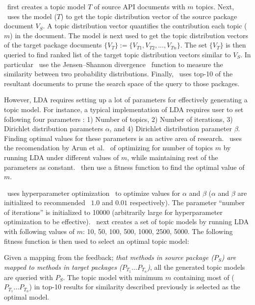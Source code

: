\tool\ first creates a topic model $T$ of source API documents with $m$ topics.
Next, \tool\ uses the model ($T$) to get the topic distribution vector of the source package document $V_{S}$.
A topic distribution vector quantifies the contribution each topic ($m$) in the document.
The model is next used to get the topic distribution vectors of the target package documents $\{V_{T}\}:=\{V_{T1},V_{T2},...,V_{Tn}\}$.
The set $\{V_{T}\}$ is then queried to find ranked list of the target topic distribution vectors similar to $V_{S}$.
In particular \tool\ use the Jensen–Shannon divergence~\cite{lin1991divergence} function to measure the similarity between two probability distributions. 
Finally, \tool\ uses top-10 of the resultant documents to prune the search space of the query to those packages.

However, LDA requires setting up a lot of parameters for effectively generating a topic model.
For instance, a typical implementation of LDA requires user to set following four parameters : 1) Number of topics, 2) Number of iterations, 3) Dirichlet distribution parameters $\alpha$, and 4) Dirichlet distribution parameter $\beta$.
Finding optimal values for these parameters is an active area of research.
\tool\ uses the recomendation by Arun et al.~\cite{arun2010finding} of optimizing for number of topics $m$ by running LDA under different values of $m$, while maintaining rest of the parameters as constant.
\tool\ then use a fitness function to find the optimal value of $m$.


\tool\ uses hyperparameter optimization~\cite{mccallum2002mallet} to optimize values for $\alpha$ and $\beta$ ($\alpha$ and $\beta$ are initialized to recommended~\cite{mccallum2002mallet} $1.0$ and $0.01$ respectively).
The parameter ``number of iterations'' is initialized to 10000 (arbitrarily large for hyperparameter optimization to be effective).
\tool\ next creates a set of topic models by running LDA with following values of $m$: 10, 50, 100, 500, 1000, 2500, 5000.
The following fitness function is then used to select an optimal topic model:

Given a mapping from the feedback; \textit{that methods in source package ($P_S$) are mapped to methods in target packages ($P_{T_1}...P_{T_n}$)}, all the generated topic models are queried with $P_S$.
The topic model with minimum $m$ containing most of ($P_{T_1}...P_{T_n}$) in top-10 results for similarity described previously is selected as the optimal model.



